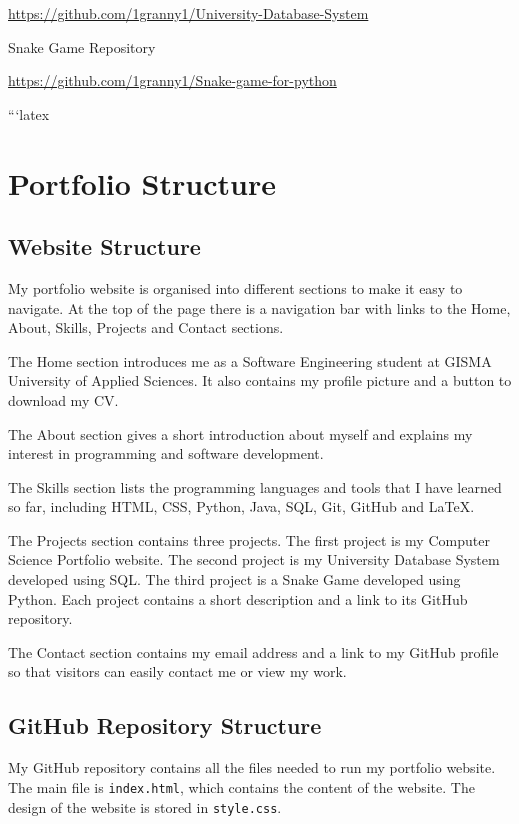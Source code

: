 \documentclass[a4paper,12pt]{article}
\begin{document}
\url{https://github.com/1granny1/University-Database-System}

\vspace{0.5cm}

Snake Game Repository

\url{https://github.com/1granny1/Snake-game-for-python}

```latex
\section{Portfolio Structure}

\subsection{Website Structure}

My portfolio website is organised into different sections to make it easy to
navigate. At the top of the page there is a navigation bar with links to the
Home, About, Skills, Projects and Contact sections.

The Home section introduces me as a Software Engineering student at GISMA
University of Applied Sciences. It also contains my profile picture and a
button to download my CV.

The About section gives a short introduction about myself and explains my
interest in programming and software development.

The Skills section lists the programming languages and tools that I have
learned so far, including HTML, CSS, Python, Java, SQL, Git, GitHub and
LaTeX.

The Projects section contains three projects. The first project is my
Computer Science Portfolio website. The second project is my University
Database System developed using SQL. The third project is a Snake Game
developed using Python. Each project contains a short description and a
link to its GitHub repository.

The Contact section contains my email address and a link to my GitHub
profile so that visitors can easily contact me or view my work.

\subsection{GitHub Repository Structure}

My GitHub repository contains all the files needed to run my portfolio
website. The main file is \texttt{index.html}, which contains the content
of the website. The design of the website is stored in
\texttt{style.css}.
\end{document}
